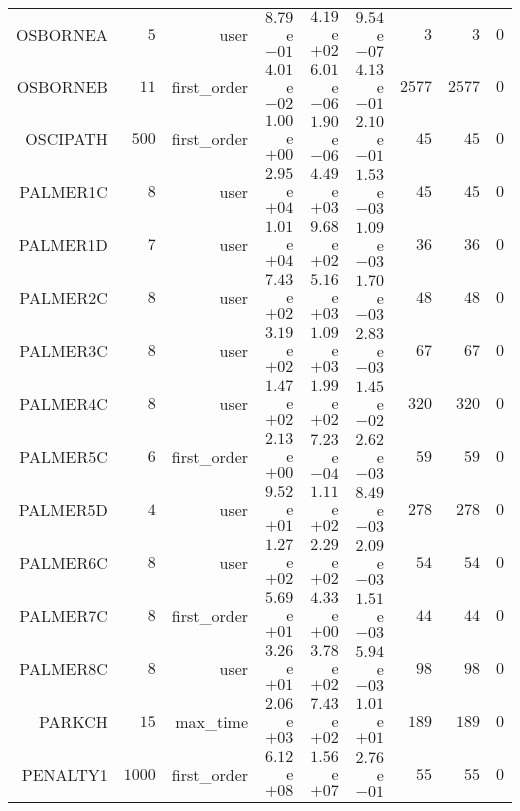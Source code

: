 \begin{longtable}{rrrrrrrrr}
OSBORNEA & \(     5\) & user & \( 8.79\)e\(-01\) & \( 4.19\)e\(+02\) & \( 9.54\)e\(-07\) & \(     3\) & \(     3\) & \(     0\) \\
OSBORNEB & \(    11\) & first\_order & \( 4.01\)e\(-02\) & \( 6.01\)e\(-06\) & \( 4.13\)e\(-01\) & \(  2577\) & \(  2577\) & \(     0\) \\
OSCIPATH & \(   500\) & first\_order & \( 1.00\)e\(+00\) & \( 1.90\)e\(-06\) & \( 2.10\)e\(-01\) & \(    45\) & \(    45\) & \(     0\) \\
PALMER1C & \(     8\) & user & \( 2.95\)e\(+04\) & \( 4.49\)e\(+03\) & \( 1.53\)e\(-03\) & \(    45\) & \(    45\) & \(     0\) \\
PALMER1D & \(     7\) & user & \( 1.01\)e\(+04\) & \( 9.68\)e\(+02\) & \( 1.09\)e\(-03\) & \(    36\) & \(    36\) & \(     0\) \\
PALMER2C & \(     8\) & user & \( 7.43\)e\(+02\) & \( 5.16\)e\(+03\) & \( 1.70\)e\(-03\) & \(    48\) & \(    48\) & \(     0\) \\
PALMER3C & \(     8\) & user & \( 3.19\)e\(+02\) & \( 1.09\)e\(+03\) & \( 2.83\)e\(-03\) & \(    67\) & \(    67\) & \(     0\) \\
PALMER4C & \(     8\) & user & \( 1.47\)e\(+02\) & \( 1.99\)e\(+02\) & \( 1.45\)e\(-02\) & \(   320\) & \(   320\) & \(     0\) \\
PALMER5C & \(     6\) & first\_order & \( 2.13\)e\(+00\) & \( 7.23\)e\(-04\) & \( 2.62\)e\(-03\) & \(    59\) & \(    59\) & \(     0\) \\
PALMER5D & \(     4\) & user & \( 9.52\)e\(+01\) & \( 1.11\)e\(+02\) & \( 8.49\)e\(-03\) & \(   278\) & \(   278\) & \(     0\) \\
PALMER6C & \(     8\) & user & \( 1.27\)e\(+02\) & \( 2.29\)e\(+02\) & \( 2.09\)e\(-03\) & \(    54\) & \(    54\) & \(     0\) \\
PALMER7C & \(     8\) & first\_order & \( 5.69\)e\(+01\) & \( 4.33\)e\(+00\) & \( 1.51\)e\(-03\) & \(    44\) & \(    44\) & \(     0\) \\
PALMER8C & \(     8\) & user & \( 3.26\)e\(+01\) & \( 3.78\)e\(+02\) & \( 5.94\)e\(-03\) & \(    98\) & \(    98\) & \(     0\) \\
PARKCH & \(    15\) & max\_time & \( 2.06\)e\(+03\) & \( 7.43\)e\(+02\) & \( 1.01\)e\(+01\) & \(   189\) & \(   189\) & \(     0\) \\
PENALTY1 & \(  1000\) & first\_order & \( 6.12\)e\(+08\) & \( 1.56\)e\(+07\) & \( 2.76\)e\(-01\) & \(    55\) & \(    55\) & \(     0\) \\

\end{longtable}
